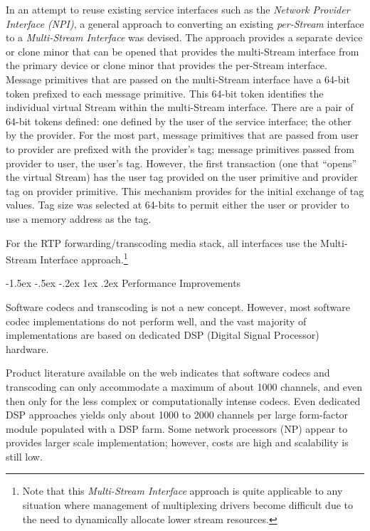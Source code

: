 \documentclass[letterpaper,final,notitlepage,twocolumn,10pt,twoside]{article}
\makeatletter
\let\normalsize = \small
\let\small = \footnotesize
\let\footnotesize = \scriptsize
\let\scriptsize = \tiny
\renewcommand\subsection{\@startsection{subsection}{2}{\z@}%
                                     {-1.5ex \@plus -.5ex \@minus -.2ex}%
                                     {1ex \@plus .2ex}%
                                     {\normalfont\normalsize\bfseries}}
\makeatother
\begin{document}
In an attempt to reuse existing service interfaces such as the {\sl Network
Provider Interface (NPI)}, a general approach to converting an existing {\it
per-Stream} interface to a {\it Multi-Stream Interface} was devised.  The
approach provides a separate device or clone minor that can be opened that
provides the multi-Stream interface from the primary device or clone minor that
provides the per-Stream interface.  Message primitives that are passed on the
multi-Stream interface have a 64-bit token prefixed to each message primitive.
This 64-bit token identifies the individual virtual Stream within the
multi-Stream interface.  There are a pair of 64-bit tokens defined: one defined
by the user of the service interface; the other by the provider.  For the most
part, message primitives that are passed from user to provider are prefixed with
the provider's tag; message primitives passed from provider to user, the user's
tag.  However, the first transaction (one that ``opens'' the virtual Stream) has
the user tag provided on the user primitive and provider tag on provider
primitive.  This mechanism provides for the initial exchange of tag values.  Tag
size was selected at 64-bits to permit either the user or provider to use a
memory address as the tag.

For the RTP forwarding/transcoding media stack, all interfaces use the
Multi-Stream Interface approach.\footnote{Note that this {\it Multi-Stream
Interface} approach is quite applicable to any situation where management of
multiplexing drivers become difficult due to the need to dynamically allocate
lower stream resources.}

\subsection{Performance Improvements}
\label{section:perf}

Software codecs and transcoding is not a new concept.  However, most software
codec implementations do not perform well, and the vast majority of
implementations are based on dedicated DSP (Digital Signal Processor) hardware.

Product literature available on the web indicates that software codecs and
transcoding can only accommodate a maximum of about 1000 channels, and even then
only for the less complex or computationally intense codecs.  Even dedicated DSP
approaches yields only about 1000 to 2000 channels per large form-factor module
populated with a DSP farm.  Some network processors (NP) appear to provides
larger scale implementation; however, costs are high and scalability is still
low.
\end{document}
